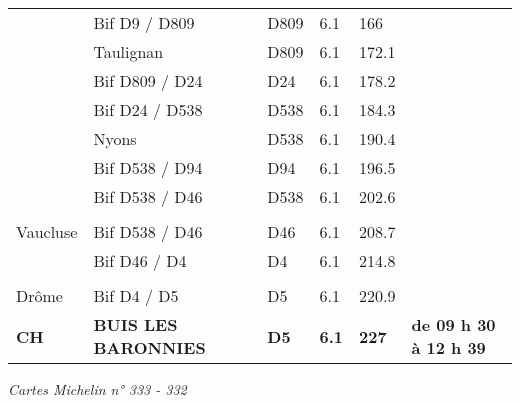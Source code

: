 \documentclass{article}%
\begin{document}
\begin{longtable}{p{2.25cm}|p{7.0cm}|p{1.5cm}|p{1.5cm}|p{1.5cm}|p{3.5cm}}
 &Bif D9 / D809&D809&6.1&166& \\%
 &Taulignan&D809&6.1&172.1& \\%
 &Bif D809 / D24&D24&6.1&178.2& \\%
 &Bif D24 / D538&D538&6.1&184.3& \\%
 &Nyons&D538&6.1&190.4& \\%
 &Bif D538 / D94&D94&6.1&196.5& \\%
 &Bif D538 / D46&D538&6.1&202.6& \\%
\hline& & & & & \\%
Vaucluse&Bif D538 / D46&D46&6.1&208.7& \\%
 &Bif D46 / D4&D4&6.1&214.8& \\%
\hline& & & & & \\%
Drôme&Bif D4 / D5&D5&6.1&220.9& \\%
\textbf{                               CH }&\textbf{BUIS LES BARONNIES}&\textbf{D5}&\textbf{6.1}&\textbf{227}&\textbf{de 09 h 30 à 12 h 39}\\%
\hline%
\end{longtable}%
\begin{flushleft} \textit{Cartes Michelin n° 333 - 332
} \end{flushleft}%
\end{document}
